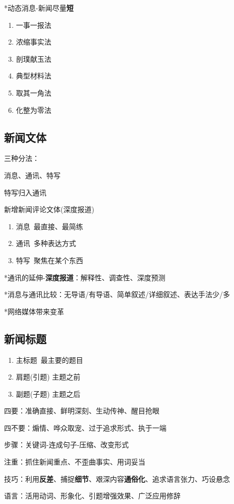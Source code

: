 \documentclass[a4paper,UTF8]{ctexart}
\begin{document}
*动态消息-新闻尽量\textbf{短}
\begin{enumerate}
	\item 一事一报法
	\item 浓缩事实法
	\item 剖璞献玉法
	\item 典型材料法
	\item 取其一角法
	\item 化整为零法
\end{enumerate}

\subsection{新闻文体}
三种分法：

消息、通讯、特写

特写归入通讯

新增新闻评论文体(深度报道)
\begin{enumerate}
	\item 消息\ 最直接、最简练
	\item 通讯\ 多种表达方式
	\item 特写\ 聚焦在某个东西
\end{enumerate}

*通讯的延伸-\textbf{深度报道}：解释性、调查性、深度预测

*消息与通讯比较：无导语/有导语、简单叙述/详细叙述、表达手法少/多

*网络媒体带来变革

\subsection{新闻标题}
\begin{enumerate}
	\item 主标题\ 最主要的题目
	\item 肩题(引题) 主题之前
	\item 副题(子题) 主题之后
\end{enumerate}

四要：准确直接、鲜明深刻、生动传神、醒目抢眼

四不要：煽情、哗众取宠、过于追求形式、执于一端

步骤：关键词-连成句子-压缩、改变形式

注重：抓住新闻重点、不歪曲事实、用词妥当

技巧：利用\textbf{反差}、捕捉\textbf{细节}、艰深内容\textbf{通俗化}、追求语言张力、巧设悬念

语言：活用动词、形象化、引题增强效果、广泛应用修辞
\end{document}
